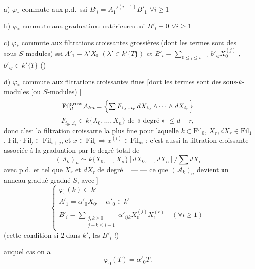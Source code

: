 \documentclass[11pt,a4paper]{article}
\begin{document}
a) $\varphi_{*}$ commute aux p.d.\ ssi $B'_{i}=A_{1}'^{(i-1)}B'_{1}$ $\forall i\geq 1$

b) $\varphi_{*}$ commute aux graduations extérieures ssi $B'_{i}=0$ $\forall i\geq 1$

c) $\varphi_{*}$ commute aux filtrations croissantes grossières (dont les termes sont des sous-$S$-modules) ssi $A'_{1}=\lambda'X_{0}$ $(\lambda'\in k'\{T\})$ et $B'_{i}=\sum_{0\leq j\leq i-1}b'_{ij}X_{0}^{(j)}$ \struck{\ill{}}, $b'_{ij}\in k'\{T\}$ ()

d) $\varphi_{*}$ commute aux filtrations croissantes fines [dont les termes sont des sous-$k$-modules \ill{} (ou $S$-modules) \ill{}]
\[
\mathrm{Fil}^{\mathrm{gross}}_{d}\mathcal{A}_{kn}
=\Bigl\{\textstyle\sum F_{i_{0}\ldots i_{r}}\,dX_{i_{0}}\wedge\cdots\wedge dX_{i_{r}}\Bigr\}
\]
\[
F_{i_{0}\ldots i_{r}}\in k\{X_{0},\ldots,X_{n}\} \text{ de « degré » }\leq d-r,
\]
donc c'est la filtration croissante la plus fine pour laquelle \struck{\ill{}} $k\subset\mathrm{Fil}_{0}$, $X_{r}, dX_{r}\in\mathrm{Fil}_{1}$, $\mathrm{Fil}_{i}\cdot\mathrm{Fil}_{j}\subset\mathrm{Fil}_{i+j}$, et $x\in\mathrm{Fil}_{d}\Rightarrow x^{(i)}\in\mathrm{Fil}_{di}$ ; c'est aussi la filtration croissante associée à la graduation par le degré total de
\[
(\mathcal{A}_{k})_{n}\simeq k\{X_{0},\ldots,X_{n}\}[dX_{0},\ldots,dX_{n}]\big/\textstyle\sum dX_{i}
\]
\ill{} avec p.d.\ et tel que $X_{r}$ et $dX_{r}$ de degré $1$ — \ill{} — \ill{} ce que $(\mathcal{A}_{k})_{n}$ devient \ill{} un anneau gradué \ill{} gradué $S$, avec  \ill{}] 
\[
\begin{cases}
\varphi_{0}(k)\subset k'\\
A'_{1}=\alpha'_{0}X_{0},\quad \alpha'_{0}\in k'\\
B'_{i}=\sum\limits_{\substack{j,k\geq 0\\ j+k\leq i-1}}\alpha'_{ijk}X_{0}^{(j)}X_{1}^{(k)}\quad (\forall i\geq 1)
\end{cases}
\]
(cette condition  si $2$  dans $k'$,  les $B'_{i}$  !)


auquel cas on a
\[
\varphi_{0}(T)=\alpha'_{0}T.
\]
\end{document}
